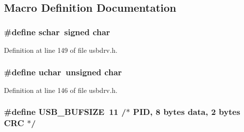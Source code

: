 \subsection{Macro Definition Documentation}
\hypertarget{mhvlib-_vusb-_keyboard_2vusb_2usbdrv_8h_af2cbb84f982ea77dfbb738af3a027591}{
\subsubsection[{schar}]{\setlength{\rightskip}{0pt plus 5cm}\#define schar~signed char}}\label{mhvlib-_vusb-_keyboard_2vusb_2usbdrv_8h_af2cbb84f982ea77dfbb738af3a027591}


Definition at line 149 of file usbdrv.\-h.

\hypertarget{mhvlib-_vusb-_keyboard_2vusb_2usbdrv_8h_aa8ddf20cdd716b652e76e23e5e700893}{
\subsubsection[{uchar}]{\setlength{\rightskip}{0pt plus 5cm}\#define uchar~unsigned char}}\label{mhvlib-_vusb-_keyboard_2vusb_2usbdrv_8h_aa8ddf20cdd716b652e76e23e5e700893}


Definition at line 146 of file usbdrv.\-h.

\hypertarget{mhvlib-_vusb-_keyboard_2vusb_2usbdrv_8h_a1c541dbab181ea7bd3da61b892430988}{
\subsubsection[{U\-S\-B\-\_\-\-B\-U\-F\-S\-I\-Z\-E}]{\setlength{\rightskip}{0pt plus 5cm}\#define U\-S\-B\-\_\-\-B\-U\-F\-S\-I\-Z\-E~11  /$\ast$ P\-I\-D, 8 bytes data, 2 bytes C\-R\-C $\ast$/}}\label{mhvlib-_vusb-_keyboard_2vusb_2usbdrv_8h_a1c541dbab181ea7bd3da61b892430988}


